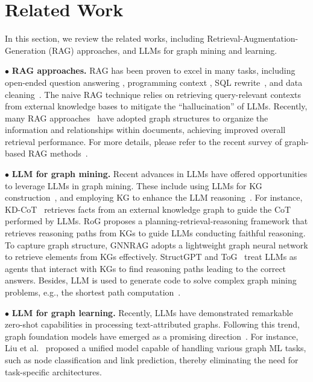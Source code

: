 \section{Related Work}
\label{sec:related-work}

In this section, we review the related works, including Retrieval-Augmentation-Generation (RAG) approaches, and LLMs for graph mining and learning.


$\bullet$ \textbf{RAG approaches.} RAG has been proven
to excel in many tasks, including open-ended question answering \cite{jeong2024adaptive,siriwardhana2023improving}, programming context \cite{chen2024auto,chen2023haipipe}, SQL rewrite~\cite{lillm,sun2024r}, and data cleaning~\cite{naeem2024retclean,narayan2022can,qian2024unidm}.
%
The naive RAG technique relies on retrieving query-relevant contexts from external knowledge bases to mitigate the ``hallucination'' of LLMs.
% 
Recently, many RAG approaches~\cite{edge2024local,guo2024lightrag,gutierrez2024hipporag,sarthi2024raptor,wang2024knowledge,he2024g,ma2024think,ma2024think,li2024dalk} have adopted graph structures to organize the information and relationships within documents, achieving improved overall retrieval performance.
%
For more details, please refer to the recent survey of graph-based RAG methods~\cite{peng2024graph}.
%


$\bullet$ \textbf{LLM for graph mining.}  Recent advances in LLMs have offered opportunities to leverage LLMs in graph mining. 
These include using LLMs for KG construction~\cite{zhu2024llms}, and employing KG to enhance the LLM reasoning~\cite{wang2023knowledge,wang2024knowledge,luo2023reasoning,sun2023think,mavromatis2024gnn,jiang2023structgpt}.
%
For instance, KD-CoT~\cite{wang2023knowledge} retrieves facts from an external knowledge graph to guide the CoT performed by LLMs.
RoG \cite{luo2023reasoning} proposes a planning-retrieval-reasoning framework that retrieves reasoning paths from KGs to guide LLMs conducting faithful reasoning.
To capture graph structure, GNNRAG \cite{mavromatis2024gnn} adopts a lightweight graph neural network to retrieve elements from KGs effectively. StructGPT \cite{jiang2023structgpt} and ToG~\cite{sun2023think} treat LLMs as agents that interact with KGs to find reasoning paths leading to the correct answers.
Besides, LLM is used to generate code to solve complex graph mining problems, e.g., the shortest path computation~\cite{chen2024graphwiz,tang2024grapharena,cao2024graphinsight,zhang2024gcoder}. 

$\bullet$ \textbf{LLM for graph learning.}
%
%
Recently, LLMs have demonstrated remarkable zero-shot capabilities in processing text-attributed graphs.
Following this trend, graph foundation models have emerged as a promising direction~\cite{liu2023one,zhang2024graphtranslator}. 
For instance, Liu et al.~\cite{liu2023one} proposed a unified model capable of handling various graph ML tasks, such as node classification and link prediction, thereby eliminating the need for task-specific architectures.
